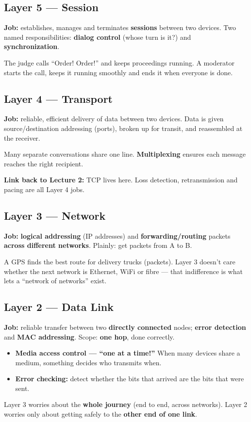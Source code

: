 \subsection{Layer 5 --- Session}
\textbf{Job:} establishes, manages and terminates \textbf{sessions} between two devices. Two named responsibilities: \textbf{dialog control} (whose turn is it?) and \textbf{synchronization}.
\begin{analogy}
The judge calls ``Order! Order!'' and keeps proceedings running. A moderator starts the call, keeps it running smoothly and ends it when everyone is done.
\end{analogy}

\subsection{Layer 4 --- Transport}
\textbf{Job:} reliable, efficient delivery of data between two devices. Data is given source/destination addressing (ports), broken up for transit, and reassembled at the receiver.
\begin{analogy}
Many separate conversations share one line. \textbf{Multiplexing} ensures each message reaches the right recipient.
\end{analogy}
\textbf{Link back to Lecture 2:} TCP lives here. Loss detection, retransmission and pacing are all Layer 4 jobs.

\subsection{Layer 3 --- Network}
\textbf{Job:} \textbf{logical addressing} (IP addresses) and \textbf{forwarding/routing} packets \textbf{across different networks}. Plainly: get packets from A to B.
\begin{analogy}[GPS]
A GPS finds the best route for delivery trucks (packets). Layer 3 doesn't care whether the next network is Ethernet, WiFi or fibre --- that indifference is what lets a ``network of networks'' exist.
\end{analogy}

\subsection{Layer 2 --- Data Link}
\textbf{Job:} reliable transfer between two \textbf{directly connected} nodes; \textbf{error detection} and \textbf{MAC addressing}. Scope: \textbf{one hop}, done correctly.
\begin{itemize}
  \item \textbf{Media access control --- ``one at a time!''} When many devices share a medium, something decides who transmits when.
  \item \textbf{Error checking:} detect whether the bits that arrived are the bits that were sent.
\end{itemize}
\begin{keyidea}
Layer 3 worries about the \textbf{whole journey} (end to end, across networks). Layer 2 worries only about getting safely to the \textbf{other end of one link}.
\end{keyidea}

